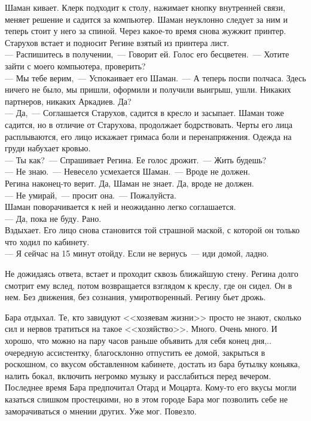 Шаман кивает. Клерк подходит к столу, нажимает кнопку внутренней связи, меняет 
решение и садится за компьютер. Шаман неуклонно следует за ним и теперь стоит у 
него за спиной. Через какое-то время снова жужжит принтер. Старухов встает и 
подносит Регине взятый из принтера лист. \\
--- Распишитесь в получении,~--- Говорит ей. Голос его бесцветен.~--- Хотите 
зайти с моего компьютера, проверить?\\
--- Мы тебе верим,~--- Успокаивает его Шаман.~--- А теперь поспи полчаса. Здесь 
ничего не было, мы пришли, оформили и получили выигрыш, ушли. Никаких партнеров, 
никаких Аркадиев. Да?\\
--- Да,~--- Соглашается Старухов, садится в кресло и засыпает. Шаман тоже 
садится, но в отличие от Старухова, продолжает бодрствовать. Черты его лица 
расплываются, его лицо искажает гримаса боли и перенапряжения. Одежда на груди набухает 
кровью.\\
--- Ты как?~--- Спрашивает Регина. Ее голос дрожит.~--- Жить будешь?\\
--- Не знаю.~--- Невесело усмехается Шаман.~--- Вроде не должен.\\
Регина наконец-то верит. Да, Шаман не знает. Да, вроде не должен.\\
--- Не умирай,~--- просит она.~--- Пожалуйста.\\
Шаман поворачивается к ней и неожиданно легко соглашается.\\
--- Да, пока не буду. Рано.\\
Вздыхает. Его лицо снова становится той страшной маской, с которой он только 
что ходил по кабинету.\\
--- Я сейчас на 15 минут отойду. Если не вернусь~--- иди домой, ладно.

Не дожидаясь ответа, встает и проходит сквозь ближайшую стену. Регина долго 
смотрит ему вслед, потом возвращается взглядом к креслу, где он сидел. Он в 
нем. Без движения, без сознания, умиротворенный. Регину бьет дрожь.

\newpage

Бара отдыхал. Те, кто завидуют <<хозяевам жизни>> просто не знают, сколько сил 
и нервов тратиться на такое <<хозяйство>>. Много. Очень много. И хорошо, что 
можно на пару часов раньше объявить для себя конец дня,.. очередную 
ассистентку, благосклонно отпустить ее домой, закрыться в роскошном, со вкусом 
обставленном кабинете, достать из бара бутылку коньяка, налить бокал, включить 
негромко музыку и расслабиться перед вечером. Последнее время Бара предпочитал 
Отард и Моцарта. Кому-то его вкусы могли казаться слишком простецкими, но в 
этом городе Бара мог позволить себе не заморачиваться о мнении других. Уже мог. 
Повезло.

